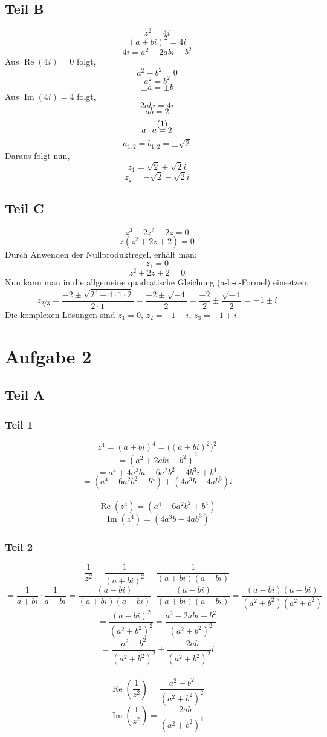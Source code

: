 \documentclass[a4paper,tikz]{article}
\begin{document}
\subsection{Teil B}

\[z^2 = 4i\]
\[(a+bi)^2 = 4i\]
\[4i = a^2 + 2abi - b^2\]
Aus $\operatorname{Re}(4i) = 0$ folgt,
\[a^2-b^2 = 0\]
\[a^2 = b^2\]
\begin{equation}
 \pm a = \pm b
\end{equation}
Aus $\operatorname{Im}(4i) = 4$ folgt,
\[2abi = 4i \]
\[ ab = 2\]
\[ a \cdot a \stackrel{\mathclap{\normalfont\mbox{(1)}}}{=} 2 \]
\[ a_{1,2} = b_{1,2} = \pm \sqrt{2}\]
Daraus folgt nun,
\[z_1 = \sqrt{2} + \sqrt{2}i\]
\[z_2 = -\sqrt{2} - \sqrt{2}i\]



\subsection{Teil C}

\[ z^3 +2z^2 + 2z = 0\]
\[ z(z^2 +2z + 2) = 0\]
Durch Anwenden der Nullproduktregel, erhält man:
\[z_1 = 0\]
\[z^2 +2z + 2 = 0\]
Nun kann man in die allgemeine quadratische Gleichung (a-b-c-Formel) einsetzen:
\[z_{2/3} = \frac{-2 \pm \sqrt{2^2 - 4 \cdot 1 \cdot 2}}{2 \cdot 1} = \frac{-2 \pm \sqrt{-4}}{2} = \frac{-2}{2} \pm \frac{\sqrt{-4}}{2} = -1 \pm i\]
Die komplexen Lösungen sind $z_1 = 0$, $z_2 = -1 - i$, $z_3 = -1 + i$.

\section{Aufgabe 2}
\subsection{Teil A}
\subsubsection{Teil 1}

\[z^4 = (a+bi)^4 = \big((a+bi)^2\big)^2\]
\[= (a^2+2abi-b^2)^2\]
\[= a^4+4a^3bi-6a^2b^2-4b^3i+b^4\]
\[= (a^4-6a^2b^2+b^4) + (4a^3b-4ab^3)i\] \\
\[ \operatorname{Re}(z^4) = (a^4-6a^2b^2+b^4)\]
\[ \operatorname{Im}(z^4) = (4a^3b-4ab^3)\]
\newpage
\subsubsection{Teil 2}
\[\frac{1}{z^2} = \frac{1}{(a+bi)^2} = \frac{1}{(a+bi)(a+bi)}\]
\[= \frac{1}{a+bi} \cdot \frac{1}{a+bi} = \frac{(a-bi)}{(a+bi)(a-bi)} \cdot \frac{(a-bi)}{(a+bi)(a-bi)} = \frac{(a-bi)(a-bi)}{(a^2+b^2)(a^2+b^2)}\]
\[= \frac{(a-bi)^2}{(a^2+b^2)^2} = \frac{a^2 - 2abi - b^2}{(a^2+b^2)^2}\]
\[= \frac{a^2-b^2}{(a^2+b^2)^2} + \frac{-2ab}{(a^2+b^2)^2}i\]
\\
\[ \operatorname{Re}(\frac{1}{z^2}) = \frac{a^2-b^2}{(a^2+b^2)^2}\]
\[ \operatorname{Im}(\frac{1}{z^2}) = \frac{-2ab}{(a^2+b^2)^2}\]
\end{document}
